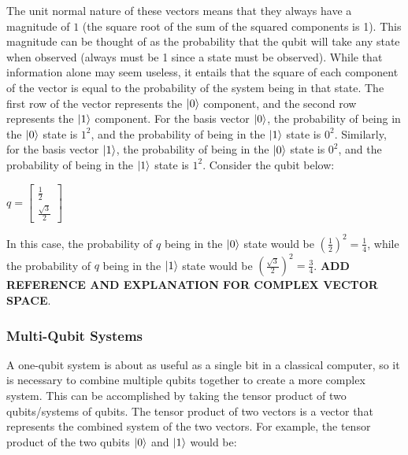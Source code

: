 \documentclass{article}
\begin{document}
The unit normal nature of these vectors means that they always have a magnitude of $1$ (the square root of the sum of the squared components is 1). This magnitude 
can be thought of as the probability that the qubit will take any state when observed (always must be 1 since a state must be observed). While that information alone may seem 
useless, it entails that the square of each component of the vector is equal to the probability of the system being in that state. The first row of the vector represents the 
$\ket{0}$ component, and the second row represents the $\ket{1}$ component. For the basis vector $\ket{0}$, the probability of being in the $\ket{0}$ state is $1^{2}$, and the 
probability of being in the $\ket{1}$ state is $0^{2}$. Similarly, for the basis vector $\ket{1}$, the probability of being in the $\ket{0}$ state is $0^{2}$, and the probability of 
being in the $\ket{1}$ state is $1^{2}$. Consider the qubit below:

\begin{center}
	$
	q =
	\begin{bmatrix}
		\frac{1}{2} \\
		\frac{\sqrt{3}}{2}
	\end{bmatrix}
	$
\end{center}

In this case, the probability of $q$ being in the $\ket{0}$ state would be $ (\frac{1}{2})^{2} = \frac{1}{4}$, while the probability of $q$ being in the $\ket{1}$ state would be 
$ (\frac{\sqrt{3}}{2})^{2} = \frac{3}{4}$.
\textbf{ADD REFERENCE AND EXPLANATION FOR COMPLEX VECTOR SPACE}. 

\subsubsection{Multi-Qubit Systems}
A one-qubit system is about as useful as a single bit in a classical computer, so it is necessary to combine multiple qubits together to create a more complex system. This can
be accomplished by taking the tensor product of two qubits/systems of qubits. The tensor product of two vectors is a vector that represents the combined system of the two
vectors. For example, the tensor product of the two qubits $\ket{0}$ and $\ket{1}$ would be:
\end{document}
